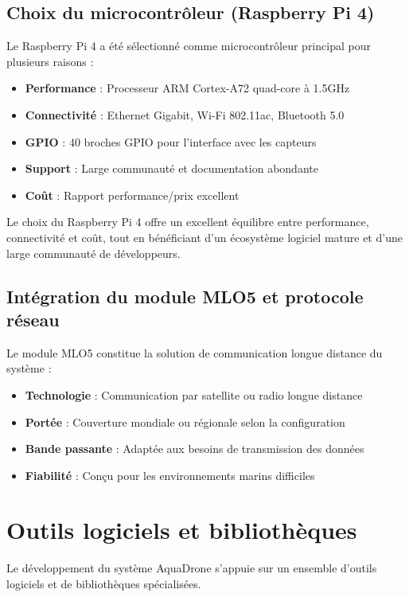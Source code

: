 {\subsection{Choix du microcontrôleur (Raspberry Pi 4)}
Le Raspberry Pi 4 a été sélectionné comme microcontrôleur principal pour plusieurs raisons :
\begin{itemize}
    \setlength{\itemsep}{.375em}
    \item \textbf{Performance} : Processeur ARM Cortex-A72 quad-core à 1.5GHz
    \item \textbf{Connectivité} : Ethernet Gigabit, Wi-Fi 802.11ac, Bluetooth 5.0
    \item \textbf{GPIO} : 40 broches GPIO pour l'interface avec les capteurs
    \item \textbf{Support} : Large communauté et documentation abondante
    \item \textbf{Coût} : Rapport performance/prix excellent
\end{itemize}

\begin{block}[tip]
Le choix du Raspberry Pi 4 offre un excellent équilibre entre performance, connectivité et coût, tout en bénéficiant d'un écosystème logiciel mature et d'une large communauté de développeurs.
\end{block}

\subsection{Intégration du module MLO5 et protocole réseau}
Le module MLO5 constitue la solution de communication longue distance du système :
\begin{itemize}
    \item \textbf{Technologie} : Communication par satellite ou radio longue distance
    \item \textbf{Portée} : Couverture mondiale ou régionale selon la configuration
    \item \textbf{Bande passante} : Adaptée aux besoins de transmission des données
    \item \textbf{Fiabilité} : Conçu pour les environnements marins difficiles
\end{itemize}

\section{Outils logiciels et bibliothèques}
Le développement du système AquaDrone s'appuie sur un ensemble d'outils logiciels et de bibliothèques spécialisées.

}
